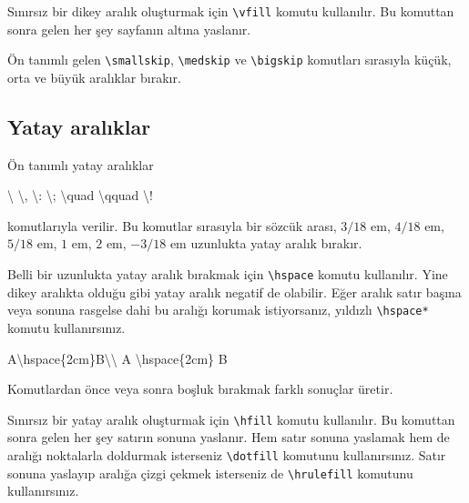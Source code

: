 \documentclass[
  10pt,
]{scrbook}
\newenvironment{Shaded}{\begin{snugshade}}{\end{snugshade}}
\newcommand{\FunctionTok}[1]{\textcolor[rgb]{0.00,0.00,0.00}{#1}}
\newcommand{\NormalTok}[1]{#1}
\theoremstyle{definition}
\theoremstyle{definition}
\theoremstyle{definition}
\theoremstyle{definition}
\theoremstyle{remark}
\begin{document}
Sınırsız bir dikey aralık oluşturmak için \texttt{\textbackslash{}vfill} komutu kullanılır. Bu komuttan sonra gelen her şey sayfanın altına yaslanır.

Ön tanımlı gelen \texttt{\textbackslash{}smallskip}, \texttt{\textbackslash{}medskip} ve \texttt{\textbackslash{}bigskip} komutları sırasıyla küçük, orta ve büyük aralıklar bırakır.

\hypertarget{yatay-aralux131klar}{%
\subsection{Yatay aralıklar}\label{yatay-aralux131klar}}

Ön tanımlı yatay aralıklar

\begin{Shaded}
\begin{Highlighting}[]
\FunctionTok{\textbackslash{} } \FunctionTok{\textbackslash{},}  \FunctionTok{\textbackslash{}:}  \FunctionTok{\textbackslash{};}  \FunctionTok{\textbackslash{}quad}  \FunctionTok{\textbackslash{}qquad}  \FunctionTok{\textbackslash{}!}
\end{Highlighting}
\end{Shaded}

komutlarıyla verilir. Bu komutlar sırasıyla bir sözcük arası, \(3/\!18\) em, \(4/\!18\) em, \(5/\!18\) em, \(1\) em, \(2\) em, \(-3/\!18\) em uzunlukta yatay aralık bırakır.

Belli bir uzunlukta yatay aralık bırakmak için \texttt{\textbackslash{}hspace} komutu kullanılır. Yine dikey aralıkta olduğu gibi yatay aralık negatif de olabilir. Eğer aralık satır başına veya sonuna rasgelse dahi bu aralığı korumak istiyorsanız, yıldızlı \texttt{\textbackslash{}hspace*} komutu kullanırsınız.

\begin{Shaded}
\begin{Highlighting}[]
\NormalTok{A}\FunctionTok{\textbackslash{}hspace}\NormalTok{\{2cm\}B}\FunctionTok{\textbackslash{}\textbackslash{}}
\NormalTok{A }\FunctionTok{\textbackslash{}hspace}\NormalTok{\{2cm\} B}
\end{Highlighting}
\end{Shaded}

Komutlardan önce veya sonra boşluk bırakmak farklı sonuçlar üretir.

Sınırsız bir yatay aralık oluşturmak için \texttt{\textbackslash{}hfill} komutu kullanılır. Bu komuttan sonra gelen her şey satırın sonuna yaslanır. Hem satır sonuna yaslamak hem de aralığı noktalarla doldurmak isterseniz \texttt{\textbackslash{}dotfill} komutunu kullanırsınız. Satır sonuna yaslayıp aralığa çizgi çekmek isterseniz de \texttt{\textbackslash{}hrulefill} komutunu kullanırsınız.
\end{document}
